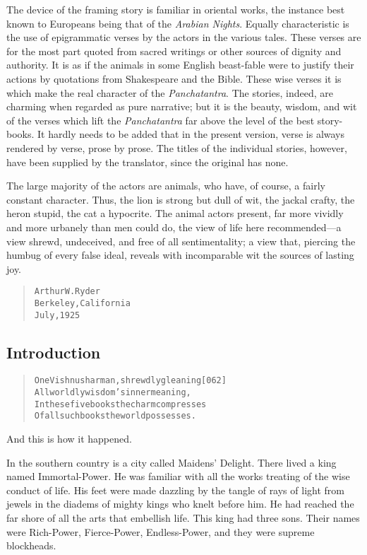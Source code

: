 \documentclass[article, twoside, 14pt]{memoir}
\renewenvironment{verbatim}{%
\begin{quote}%
\vskip -10pt%
\begin{alltt}\normalfont\large}{\end{alltt}%
\end{quote}%
\vskip -10pt
} %
\begin{document}
The device of the framing story is familiar in oriental works, the
instance best known to Europeans being that of the
\emph{Arabian Nights}. Equally characteristic is the use of
epigrammatic verses by the actors in the various tales. These
verses are for the most part quoted from sacred writings or other
sources of dignity and authority. It is as if the animals in some
English beast-fable were to justify their actions by quotations
from Shakespeare and the Bible. These wise verses it is which make
the real character of the \emph{Panchatantra}. The stories, indeed,
are charming when regarded as pure narrative; but it is the beauty,
wisdom, and wit of the verses which lift the \emph{Panchatantra}
far above the level of the best story-books. It hardly needs to be
added that in the present version, verse is always rendered by
verse, prose by prose. The titles of the individual stories,
however, have been supplied by the translator, since the original
has none.

The large majority of the actors are animals, who have, of course,
a fairly constant character. Thus, the lion is strong but dull of
wit, the jackal crafty, the heron stupid, the cat a hypocrite. The
animal actors present, far more vividly and more urbanely than men
could do, the view of life here recommended---a view shrewd,
undeceived, and free of all sentimentality; a view that, piercing
the humbug of every false ideal, reveals with incomparable wit the
sources of lasting joy.

\begin{verbatim}
                            Arthur W. Ryder
                            Berkeley, California
                            July, 1925
\end{verbatim}
\subsection{Introduction}

\begin{verbatim}
One Vishnusharman, shrewdly gleaning                    [062]
All worldly wisdom's inner meaning,
In these five books the charm compresses
Of all such books the world possesses.
\end{verbatim}
And this is how it happened.

In the southern country is a city called Maidens' Delight. There
lived a king named Immortal-Power. He was familiar with all the
works treating of the wise conduct of life. His feet were made
dazzling by the tangle of rays of light from jewels in the diadems
of mighty kings who knelt before him. He had reached the far shore
of all the arts that embellish life. This king had three sons.
Their names were Rich-Power, Fierce-Power, Endless-Power, and they
were supreme blockheads.
\end{document}
